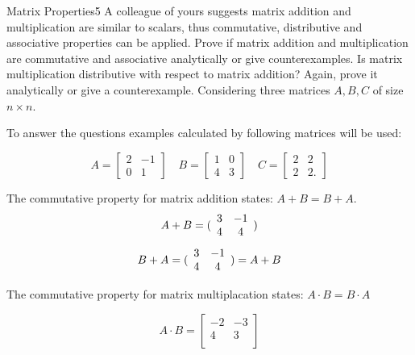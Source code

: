 \newif\ifvimbug
\vimbugfalse

\ifvimbug

\fi

 

\begin{questions}


\begin{question}{Matrix Properties}{5}
A colleague of yours suggests matrix addition and multiplication are similar to scalars, thus commutative, distributive and associative properties can be applied.
Prove if matrix addition and multiplication are commutative and associative analytically or give counterexamples. 
Is matrix multiplication distributive with respect to matrix addition? 
Again, prove it analytically or give a counterexample.
Considering three matrices $ A, B, C$ of size $n\times n$.

\begin{answer}
To answer the questions examples calculated by following matrices will be used:


\[
A=
\begin{bmatrix}
2 & -1  \\
0 &  1 
\end{bmatrix}\quad
B=
\begin{bmatrix}
1 & 0  \\
4 & 3 
\end{bmatrix}\quad
C=
\begin{bmatrix}
2 & 2  \\
2 & 2 
.
\end{bmatrix}
\]

	
The commutative property for matrix addition states: $A+B = B + A$.
\begin{equation}
	A + B = ( \begin{array}{c c} 
		3 & -1 \\
		4 & 4 \end{array} )
\end{equation}
\begin{equation}
B + A = ( \begin{array}{c c} 
3 & -1 \\
4 & 4 \end{array} ) = A + B
\end{equation}

The commutative property for matrix multiplacation states: $A \cdot B = B \cdot A$

\begin{equation}
	A \cdot B = \begin{bmatrix}
	-2 & -3 \\
	4 & 3\\
	\end{bmatrix}
\end{equation}


\end{answer}
\end{question}
\end{questions}

